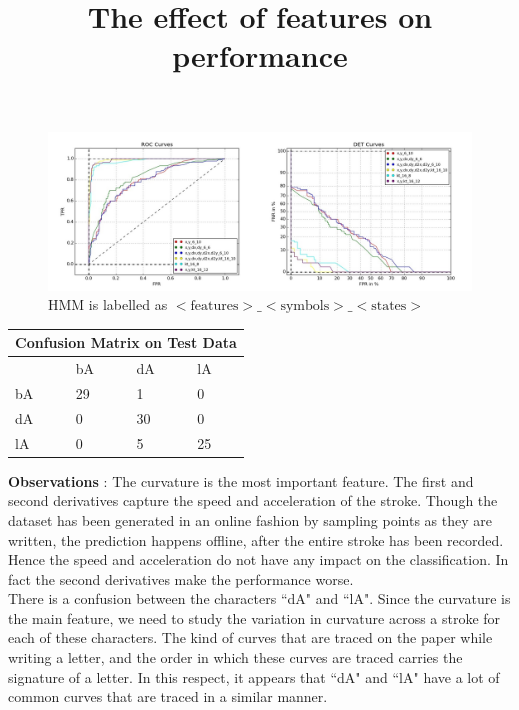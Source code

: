 \documentclass{article}
\begin{document}
\begin{figure}[h!]
\centering
\title{The effect of features on performance}
\includegraphics[width=\textwidth]{handwriting/plots/hmm/roc_det_compare.jpg}
\caption{HMM is labelled as $<\text{features}>\_<\text{symbols}>\_<\text{states}>$}
\end{figure}

\begin{table}[h!]
\centering
\begin{tabular}{ |p{1.5cm}|p{1.5cm}|p{1.5cm}|p{1.5cm}|  }
\hline
\multicolumn{4}{|c|}{Confusion Matrix on Test Data} \\
\hline
 & bA & dA & lA \\
\hline
bA & 29 & 1 & 0\\
dA & 0 & 30 & 0\\
lA & 0 & 5 & 25\\
\hline
\end{tabular}
\end{table}

\newpage
\textbf{Observations} : The curvature is the most important feature. The first and second derivatives capture the speed and acceleration of the stroke. Though the dataset has been generated in an online fashion by sampling points as they are written, the prediction happens offline, after the entire stroke has been recorded. Hence the speed and acceleration do not have any impact on the classification. In fact the second derivatives make the performance worse.\\
There is a confusion between the characters ``dA" and ``lA". Since the curvature is the main feature, we need to study the variation in curvature across a stroke for each of these characters. The kind of curves that are traced on the paper while writing a letter, and the order in which these curves are traced carries the signature of a letter. In this respect, it appears that ``dA" and ``lA" have a lot of common curves that are traced in a similar manner. 
\end{document}
